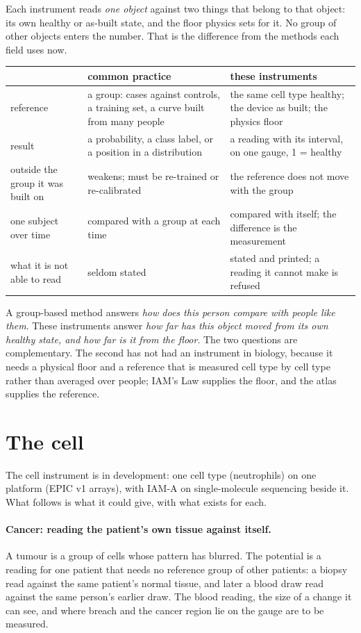 Each instrument reads \emph{one object} against two things that belong to that object: its own healthy or as-built state, and the floor
physics sets for it. No group of other objects enters the number. That is the difference from the methods each field uses now.
\begin{center}\small
\begin{tabular}{@{}p{}p{}p{}@{}}\toprule
 & common practice & these instruments \\\midrule
reference & a group: cases against controls, a training set, a curve built from many people & the same cell type healthy; the device as built; the physics floor \\
result & a probability, a class label, or a position in a distribution & a reading with its interval, on one gauge, 1 = healthy \\
outside the group it was built on & weakens; must be re-trained or re-calibrated & the reference does not move with the group \\
one subject over time & compared with a group at each time & compared with itself; the difference is the measurement \\
what it is not able to read & seldom stated & stated and printed; a reading it cannot make is refused \\\bottomrule
\end{tabular}
\end{center}
A group-based method answers \emph{how does this person compare with people like them}. These instruments answer \emph{how far has this
object moved from its own healthy state, and how far is it from the floor}. The two questions are complementary. The second has not had an
instrument in biology, because it needs a physical floor and a reference that is measured cell type by cell type rather than averaged over
people; IAM's Law supplies the floor, and the atlas supplies the reference.

\section{The cell}
The cell instrument is in development: one cell type (neutrophils) on one platform (EPIC v1 arrays), with IAM-A on single-molecule
sequencing beside it. What follows is what it could give, with what exists for each.

\paragraph{Cancer: reading the patient's own tissue against itself.} A tumour is a group of cells whose pattern has blurred. The potential is a reading for one patient that needs no reference group of
other patients: a biopsy read against the same patient's normal tissue, and later a blood draw read against the same person's earlier draw.
The blood reading, the size of a change it can see, and where breach and the cancer region lie on the gauge are to be measured. \openprob

